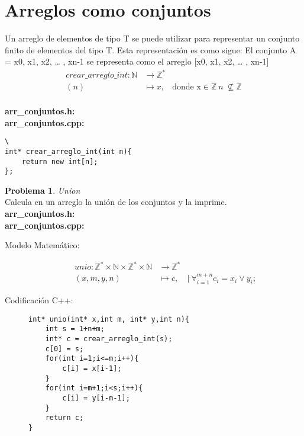 \documentclass{article}
\theoremstyle{plain}
\theoremstyle{definition}
\newtheorem{problem}{Problema}
\begin{document}
\section{Arreglos como conjuntos}
\begin{description}
Un arreglo de elementos de tipo T se puede utilizar para representar un conjunto finito de elementos del tipo T. Esta representación es como sigue:
El conjunto A = {x0, x1, x2, … , xn-1} se representa como el arreglo [x0, x1, x2, … , xn-1]
%
\begin{align*}
crear\_arreglo\_int: \mathbb{N} &\to \mathbb{Z}^*\\
(n) &\mapsto x,& \text{donde x} \in \mathbb{Z} \ n\ \not\subseteq \mathbb{Z}
\end{align*}\\
\textbf{arr\_conjuntos.h:}\ \\
\textbf{arr\_conjuntos.cpp:}\ 
%
\item[Codificación \textsf{C++}:]\hfill 
%
\begin{verbatim}\
int* crear_arreglo_int(int n){
    return new int[n];
};
\end{verbatim}
\end{description}
%
\begin{problem} \emph{Union}\\
Calcula en un arreglo la unión de los conjuntos y la imprime.\\
\textbf{arr\_conjuntos.h:}\ \\
\textbf{arr\_conjuntos.cpp:}\ 
%
\begin{description}
\item[Modelo Matemático:]
%
\begin{align*}
unio: \mathbb{Z}^*\times\mathbb{N}\times\mathbb{Z}^*\times\mathbb{N} &\to \mathbb{Z}^*\\
(x,m,y,n) &\mapsto c,& |\ \forall_{i=1}^{m+n} c_i = x_i \vee y_i;
\end{align*}
%
\item[Codificación \textsf{C++}:]\hfill
%
\begin{verbatim}
int* unio(int* x,int m, int* y,int n){
    int s = 1+n+m;
    int* c = crear_arreglo_int(s);
    c[0] = s;
    for(int i=1;i<=m;i++){
        c[i] = x[i-1];
    }
    for(int i=m+1;i<s;i++){
        c[i] = y[i-m-1];
    }
    return c;
}
\end{verbatim}
\end{description}
\end{problem}
\end{document}
